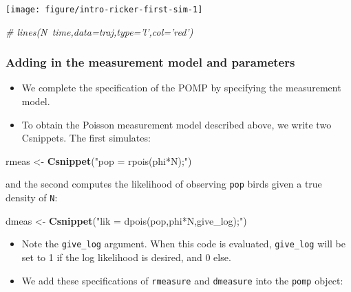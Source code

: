 \documentclass[]{article}
\newenvironment{Shaded}{\begin{snugshade}}{\end{snugshade}}
\newcommand{\KeywordTok}[1]{\textcolor[rgb]{0.13,0.29,0.53}{\textbf{#1}}}
\newcommand{\StringTok}[1]{\textcolor[rgb]{0.31,0.60,0.02}{#1}}
\newcommand{\CommentTok}[1]{\textcolor[rgb]{0.56,0.35,0.01}{\textit{#1}}}
\newcommand{\NormalTok}[1]{#1}
\begin{document}
\begin{center}\texttt{[image: figure/intro-ricker-first-sim-1]} \end{center}

\begin{Shaded}
\begin{Highlighting}[]
\CommentTok{# lines(N~time,data=traj,type='l',col='red')}
\end{Highlighting}
\end{Shaded}

\subsubsection{Adding in the measurement model and
parameters}\label{adding-in-the-measurement-model-and-parameters}

\begin{itemize}
\item
  We complete the specification of the POMP by specifying the
  measurement model.
\item
  To obtain the Poisson measurement model described above, we write two
  Csnippets. The first simulates:
\end{itemize}

\begin{Shaded}
\begin{Highlighting}[]
\NormalTok{rmeas <-}\StringTok{ }\KeywordTok{Csnippet}\NormalTok{(}\StringTok{"pop = rpois(phi*N);"}\NormalTok{)}
\end{Highlighting}
\end{Shaded}

and the second computes the likelihood of observing \texttt{pop} birds
given a true density of \texttt{N}:

\begin{Shaded}
\begin{Highlighting}[]
\NormalTok{dmeas <-}\StringTok{ }\KeywordTok{Csnippet}\NormalTok{(}\StringTok{"lik = dpois(pop,phi*N,give_log);"}\NormalTok{)}
\end{Highlighting}
\end{Shaded}

\begin{itemize}
\item
  Note the \texttt{give\_log} argument. When this code is evaluated,
  \texttt{give\_log} will be set to 1 if the log likelihood is desired,
  and 0 else.
\item
  We add these specifications of \texttt{rmeasure} and \texttt{dmeasure}
  into the \texttt{pomp} object:
\end{itemize}
\end{document}
